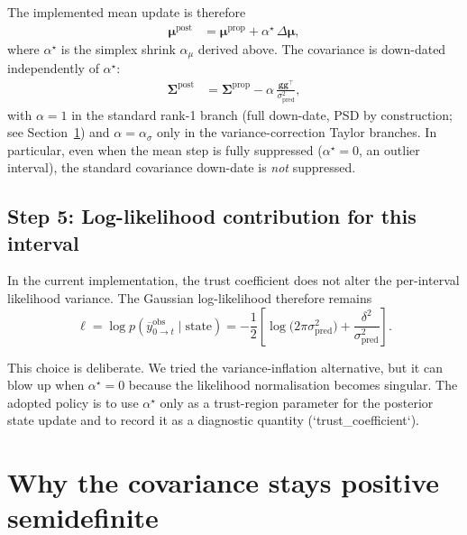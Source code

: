 \documentclass[11pt]{article}
\begin{document}
The implemented mean update is therefore
\begin{align}
  \boldsymbol{\mu}^{\text{post}}
  &=
  \boldsymbol{\mu}^{\text{prop}}
  +
  \alpha^\star\,\Delta\boldsymbol{\mu},
  \label{eq:final-mean-update}
\end{align}
where \(\alpha^\star\) is the simplex shrink \(\alpha_\mu\) derived above. The
covariance is down-dated independently of \(\alpha^\star\):
\begin{align}
  \boldsymbol{\Sigma}^{\text{post}}
  &=
  \boldsymbol{\Sigma}^{\text{prop}}
  -
  \alpha\,\frac{\mathbf{g}\mathbf{g}^\top}{\sigma^2_{\text{pred}}},
  \label{eq:final-cov-update}
\end{align}
with \(\alpha=1\) in the standard rank-1 branch (full down-date, PSD by
construction; see Section~\ref{sec:covariance-psd}) and \(\alpha=\alpha_\sigma\)
only in the variance-correction Taylor branches. In particular, even when the
mean step is fully suppressed (\(\alpha^\star=0\), an outlier interval), the
standard covariance down-date is \emph{not} suppressed.

\subsection{Step 5: Log-likelihood contribution for this interval}

In the current implementation, the trust coefficient does not alter the
per-interval likelihood variance. The Gaussian log-likelihood therefore
remains
\[
  \ell
  =
  \log p(\overline{y}^{\text{obs}}_{0\to t}\mid \text{state})
  =
  -\frac{1}{2}
  \left[
    \log\bigl(2\pi\sigma^2_{\text{pred}}\bigr)
    +
    \frac{\delta^2}{\sigma^2_{\text{pred}}}
  \right].
\]

This choice is deliberate. We tried the variance-inflation alternative, but
it can blow up when \(\alpha^\star=0\) because the likelihood normalisation
becomes singular. The adopted policy is to use \(\alpha^\star\) only as a
trust-region parameter for the posterior state update and to record it as a
diagnostic quantity (`trust\_coefficient`).


\section{Why the covariance stays positive semidefinite}
\label{sec:covariance-psd}
\end{document}
